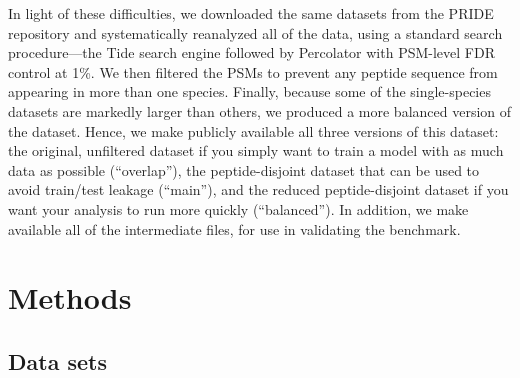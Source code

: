 \documentclass{article}
\begin{document}
In light of these difficulties, we downloaded the same datasets from the PRIDE repository and systematically reanalyzed all of the data, using a standard search procedure---the Tide search engine \cite{diament2011faster} followed by Percolator \cite{kall2007semi-supervised} with PSM-level FDR control at 1\%.
We then filtered the PSMs to prevent any peptide sequence from appearing in more than one species.
Finally, because some of the single-species datasets are markedly larger than others, we produced a more balanced version of the dataset.
Hence, we make publicly available all three versions of this dataset: the original, unfiltered dataset if you simply want to train a model with as much data as possible (``overlap''), the peptide-disjoint dataset that can be used to avoid train/test leakage (``main''), and the reduced peptide-disjoint dataset if you want your analysis to run more quickly (``balanced'').
In addition, we make available all of the intermediate files, for use in validating the benchmark.

\section*{Methods}

\subsection*{Data sets}
\end{document}
